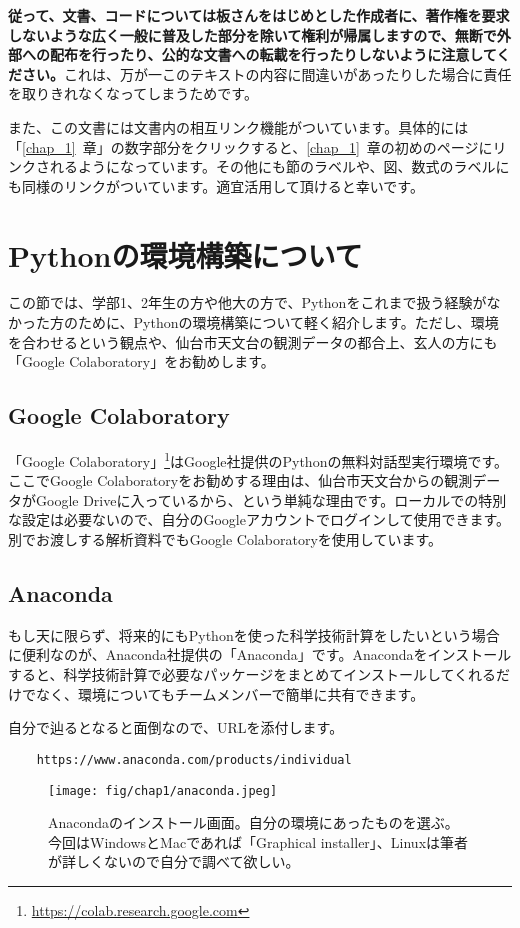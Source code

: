 \textbf{従って、文書、コードについては板さんをはじめとした作成者に、著作権を要求しないような広く一般に普及した部分を除いて権利が帰属しますので、無断で外部への配布を行ったり、公的な文書への転載を行ったりしないように注意してください。}これは、万が一このテキストの内容に間違いがあったりした場合に責任を取りきれなくなってしまうためです。

また、この文書には文書内の相互リンク機能がついています。具体的には「\ref{chap_1}~章」の数字部分をクリックすると、\ref{chap_1}~章の初めのページにリンクされるようになっています。その他にも節のラベルや、図、数式のラベルにも同様のリンクがついています。適宜活用して頂けると幸いです。

\section{Pythonの環境構築について}%
\label{sec_1_5}
この節では、学部1、2年生の方や他大の方で、Pythonをこれまで扱う経験がなかった方のために、Pythonの環境構築について軽く紹介します。ただし、環境を合わせるという観点や、仙台市天文台の観測データの都合上、玄人の方にも「Google Colaboratory」をお勧めします。

\subsection{Google Colaboratory}%
\label{subsec_1_5_1}
「Google Colaboratory」\footnote{\url{https://colab.research.google.com}}はGoogle社提供のPythonの無料対話型実行環境です。ここでGoogle Colaboratoryをお勧めする理由は、仙台市天文台からの観測データがGoogle Driveに入っているから、という単純な理由です。ローカルでの特別な設定は必要ないので、自分のGoogleアカウントでログインして使用できます。別でお渡しする解析資料でもGoogle Colaboratoryを使用しています。

\subsection{Anaconda}%
\label{subsec_1_5_2}
もし天に限らず、将来的にもPythonを使った科学技術計算をしたいという場合に便利なのが、Anaconda社提供の「Anaconda」です。Anacondaをインストールすると、科学技術計算で必要なパッケージをまとめてインストールしてくれるだけでなく、環境についてもチームメンバーで簡単に共有できます。

自分で辿るとなると面倒なので、URLを添付します。
\begin{verbatim}
    https://www.anaconda.com/products/individual
\end{verbatim}
\begin{figure}
    \centering
    \texttt{[image: fig/chap1/anaconda.jpeg]}
    \caption[Anacondaのインストール]{Anacondaのインストール画面。自分の環境にあったものを選ぶ。今回はWindowsとMacであれば「Graphical installer」、Linuxは筆者が詳しくないので自分で調べて欲しい。\label{fig_1_1}}
\end{figure}

